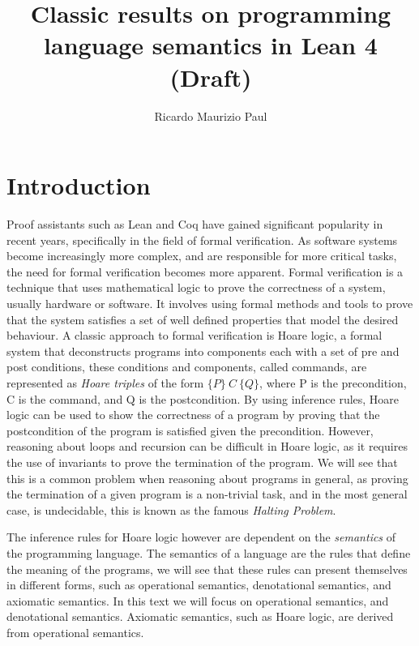 \documentclass[
  a4paper, 
  10pt, 
  parskip=half, 
  DIV=20,
  toc=bibliography,
  usegeometry,
]{scrartcl}
\title{Classic results on programming language semantics in Lean 4 (Draft)}
\author{Ricardo Maurizio Paul}
\begin{document}
\maketitle

\tableofcontents

\section{Introduction}

Proof assistants such as Lean and Coq have gained significant popularity in
recent years, specifically in the field of formal verification. As software
systems become increasingly more complex, and are responsible for more
critical tasks, the need for formal verification becomes more apparent. Formal
verification is a technique that uses mathematical logic to prove the
correctness of a system, usually hardware or software. It involves using formal
methods and tools to prove that the system satisfies a set of well defined
properties that model the desired behaviour. A classic approach to formal
verification is Hoare logic, a formal system that deconstructs programs into
components each with a set of pre and post conditions, these conditions and
components, called commands, are represented as \emph{Hoare triples} of the form
\(\{P\} \ C \ \{Q\}\),
where P is the precondition, C is the command, and Q is the postcondition. By
using inference rules, Hoare logic can be used to show the correctness of a
program by proving that the postcondition of the program is satisfied given the
precondition. However, reasoning about loops and recursion can be difficult in
Hoare logic, as it requires the use of invariants to prove the termination of
the program. We will see that this is a common problem when reasoning about
programs in general, as proving the termination of a given program is a
non-trivial task, and in the most general case, is undecidable, this is known as
the famous \emph{Halting Problem}.

The inference rules for Hoare logic however are dependent on the \emph{semantics} of
the programming language. The semantics of a language are the rules that define 
the meaning of the programs, we
will see that these rules can present themselves in different forms, such as
operational semantics, denotational semantics, and axiomatic semantics. In this
text we will focus on operational semantics, and denotational semantics.
Axiomatic semantics, such as Hoare logic, are derived from operational
semantics.
\end{document}
